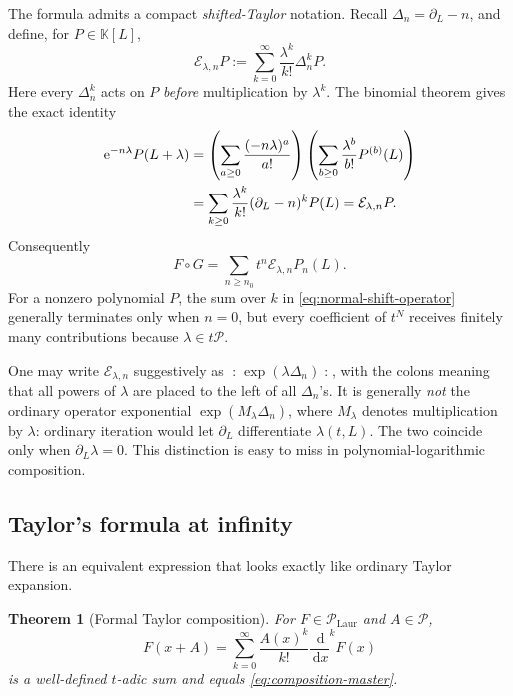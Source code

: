 \documentclass[11pt]{article}
\theoremstyle{pltheorem}
\newtheorem{theorem}{Theorem}[section]
\newcommand{\K}{\mathbb K}
\newcommand{\PL}{\mathscr P}
\newcommand{\PLL}{\mathscr P_{\mathrm{Laur}}}
\newcommand{\dd}{\,\mathrm d}
\newcommand{\e}{\mathrm e}
\newcommand{\D}{\frac{\dd}{\dd x}}
\newcommand{\compose}{\mathbin{\circ}}
\begin{document}
The formula admits a compact \emph{shifted-Taylor} notation.  Recall
\(\Delta_n=\partial_L-n\), and define, for \(P\in\K[L]\),
\begin{equation}\label{eq:normal-shift-operator}
 \mathcal E_{\lambda,n}P
 :=\sum_{k=0}^{\infty}\frac{\lambda^k}{k!}\Delta_n^kP.
\end{equation}
Here every \(\Delta_n^k\) acts on \(P\) \emph{before} multiplication by
\(\lambda^k\).  The binomial theorem gives the exact identity
\begin{align}
 \e^{-n\lambda}P(L+\lambda)
 &=\left(\sum_{a\ge0}\frac{(-n\lambda)^a}{a!}\right)
   \left(\sum_{b\ge0}\frac{\lambda^b}{b!}P^{(b)}(L)\right)\notag\\
 &=\sum_{k\ge0}\frac{\lambda^k}{k!}(\partial_L-n)^kP(L)
 =\mathcal E_{\lambda,n}P.\label{eq:shifted-Taylor-identity}
\end{align}
Consequently
\begin{equation}\label{eq:composition-operator-form}
 F\compose G
 =\sum_{n\ge n_0}t^n\mathcal E_{\lambda,n}P_n(L).
\end{equation}
For a nonzero polynomial \(P\), the sum over \(k\) in
\cref{eq:normal-shift-operator} generally terminates only when \(n=0\),
but every coefficient of \(t^N\) receives finitely many
contributions because \(\lambda\in t\PL\).

\begin{warningbox}
One may write \(\mathcal E_{\lambda,n}\) suggestively as
\(\mathopen{:}\!\exp(\lambda\Delta_n)\!\mathclose{:}\), with the colons
meaning that all powers of \(\lambda\) are placed to the left of all
\(\Delta_n\)'s.  It is generally \emph{not} the ordinary operator
exponential \(\exp(M_\lambda\Delta_n)\), where \(M_\lambda\) denotes
multiplication by \(\lambda\): ordinary iteration would let
\(\partial_L\) differentiate \(\lambda(t,L)\).  The two coincide only
when \(\partial_L\lambda=0\).  This distinction is easy to miss in
polynomial-logarithmic composition.
\end{warningbox}

\subsection{Taylor's formula at infinity}

There is an equivalent expression that looks exactly like ordinary Taylor expansion.

\begin{theorem}[Formal Taylor composition]\label{thm:formal-Taylor}
For \(F\in\PLL\) and \(A\in\PL\),
\begin{equation}\label{eq:formal-Taylor}
 F(x+A)=\sum_{k=0}^{\infty}\frac{A(x)^k}{k!}\D^kF(x)
\end{equation}
is a well-defined \(t\)-adic sum and equals \cref{eq:composition-master}.
\end{theorem}
\end{document}
